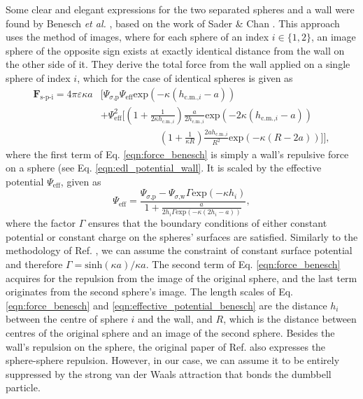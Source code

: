 \documentclass{master_thesis}
\begin{document}
Some clear and elegant expressions for the two separated spheres and a wall were found by Benesch \textit{et al.} \cite{benesch2005}, based on the work of Sader \& Chan \cite{sader_1999}. This approach uses the method of images, where for each sphere of an index $i\in\{1,2\}$, an image sphere of the opposite sign exists at exactly identical distance from the wall on the other side of it. They derive the total force from the wall applied on a single sphere of index $i$, which for the case of identical spheres is given as
\begin{equation}
\begin{split}
    \boldsymbol{F}_{\textrm{s-p-i}} = 4 \pi \varepsilon \kappa a &\Biggl[ \Psi_{\sigma\textrm{,p}} \Psi_{\textrm{eff}} \textrm{exp} \left( -\kappa\left( h_{\textrm{c.m.,}i} - a \right)\right) \\ 
    &+ \Psi_{\textrm{eff}}^2 \biggl[ \left( 1 + \frac{1}{2 \kappa h_{\textrm{c.m.,}i}} \right)\frac{a}{2 h_{\textrm{c.m.,}i}} \textrm{exp}\left(-2\kappa\left( h_{\textrm{c.m.,}i} - a \right)\right) \\ 
    &\qquad\qquad\qquad \left(1 + \frac{1}{\kappa R}\right) \frac{2ah_{\textrm{c.m.,}i}}{R^2} \textrm{exp}\left(-\kappa\left( R - 2a \right) \right) \biggr] \Biggr],
\end{split}
\label{eqn:force_benesch}
\end{equation}
where the first term of Eq. \eqref{eqn:force_benesch} is simply a wall's repulsive force on a sphere (see Eq. \eqref{eqn:edl_potential_wall}. It is scaled by the effective potential $\Psi_{\textrm{eff}}$, given as
\begin{equation}
    \Psi_{\textrm{eff}} = \frac{\Psi_{\sigma\textrm{,p}} - \Psi_{\sigma\textrm{,w}} \Gamma \textrm{exp} (-\kappa h_i)}{1 + \frac{a} {2 h_i \Gamma \textrm{exp} (-\kappa (2 h_i - a))}},
\label{eqn:effective_potential_benesch}
\end{equation}
where the factor $\Gamma$ ensures that the boundary conditions of either constant potential or constant charge on the spheres' surfaces are satisfied. Similarly to the methodology of Ref. \cite{verweij2021}, we can assume the constraint of constant surface potential and therefore $\Gamma = \textrm{sinh}(\kappa a) / \kappa a$. The second term of Eq. \eqref{eqn:force_benesch} acquires for the repulsion from the image of the original sphere, and the last term originates from the second sphere's image.  The length scales of Eq. \eqref{eqn:force_benesch} and \eqref{eqn:effective_potential_benesch} are the distance $h_i$ between the centre of sphere $i$ and the wall, and $R$, which is the distance between centres of the original sphere and an image of the second sphere. Besides the wall's repulsion on the sphere, the original paper of Ref. \cite{benesch2005} also expresses the sphere-sphere repulsion. However, in our case, we can assume it to be entirely suppressed by the strong van der Waals attraction that bonds the dumbbell particle.
\end{document}
